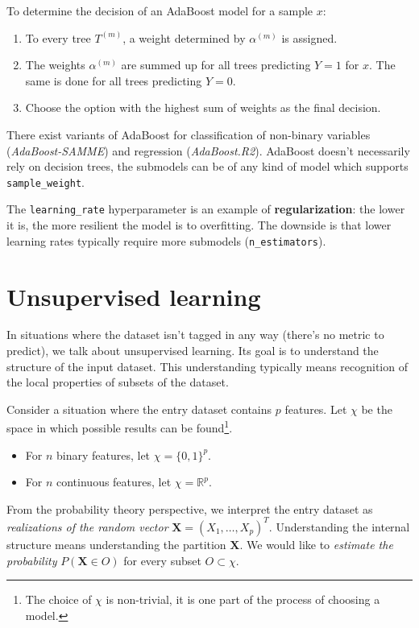 \documentclass[a4paper]{article}
\begin{document}
	To determine the decision of an AdaBoost model for a sample $x$:
	\begin{enumerate}
		\item To every tree $T^{(m)}$, a weight determined by $\alpha^{(m)}$ is assigned.
		\item The weights $\alpha^{(m)}$ are summed up for all trees predicting $Y = 1$ for $x$.
			The same is done for all trees predicting $Y = 0$.
		\item Choose the option with the highest sum of weights as the final decision.
	\end{enumerate}

	There exist variants of AdaBoost for classification of non-binary variables (\textit{AdaBoost-SAMME})
	and regression (\textit{AdaBoost.R2}). AdaBoost doesn't necessarily rely on decision trees,
	the submodels can be of any kind of model which supports \texttt{sample\_weight}.

	The \texttt{learning\_rate} hyperparameter is an example of \textbf{regularization}:
	the lower it is, the more resilient the model is to overfitting. The downside is that
	lower learning rates typically require more submodels (\texttt{n\_estimators}).

	\section{Unsupervised learning}
	In situations where the dataset isn't tagged in any way (there's no metric to predict),
	we talk about unsupervised learning. Its goal is to understand the structure of the
	input dataset. This understanding typically means recognition of the local properties of
	subsets of the dataset.

	Consider a situation where the entry dataset contains $p$ features. Let $\chi$ be the
	space in which possible results can be found\footnote{The choice of $\chi$ is non-trivial,
	it is one part of the process of choosing a model.}.
	\begin{itemize}
		\item For $n$ binary features, let $\chi = \{0, 1\}^p$.
		\item For $n$ continuous features, let $\chi = \mathbb{R}^p$.
	\end{itemize}

	From the probability theory perspective, we interpret the entry dataset as
	\textit{realizations of the random vector} $\boldsymbol{X} = (X_1, \ldots, X_p)^T$.
	Understanding the internal structure means understanding the partition $\boldsymbol{X}$.
	We would like to \textit{estimate the probability} $P(\boldsymbol{X} \in O)$ for
	every subset $O \subset \chi$.
\end{document}
